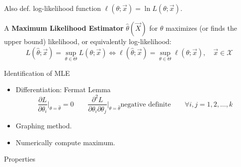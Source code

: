     

    Also def. log-likelihood function $\ell(\theta;\vec{x})=\ln L(\theta;\vec{x})$.

    A \textbf{Maximum Likelihood Estimator} $\hat{\theta}(\vec{X})$ for $ \theta  $ maximizes (or finds the upper bound) likelihood, or equivalently log-likelihood:
    \begin{equation}
        L(\hat{\theta};\vec{x})=\sup_{\theta\in\Theta}L(\theta;\vec{x})\Leftrightarrow \ell(\hat{\theta};\vec{x})=\sup_{\theta\in\Theta}\ell(\theta;\vec{x}) ,\quad \vec{x}\in\mathscr{X}
    \end{equation}

    \begin{point}
        Identification of MLE
    \end{point}
    
    \begin{itemize}[topsep=2pt,itemsep=0pt]
        \item Differentiation: Fermat Lemma
        \begin{equation}
            \frac{\partial L}{\partial \theta_i}\bigg|_{\theta=\hat{\theta}}=0\qquad \frac{\partial^2 L}{\partial \theta_i \partial \theta_j}\bigg|_{\theta=\hat{\theta}}\text{negative definite}\qquad \forall i,j=1,2,\ldots,k
        \end{equation}
        \item Graphing method.
        \item Numerically compute maximum.
    \end{itemize}

    \begin{point}
        Properties
    \end{point}
    

